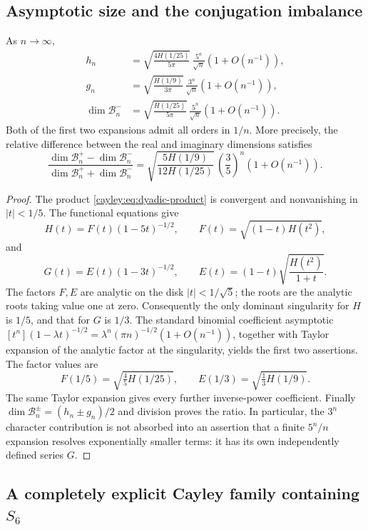 \subsection{Asymptotic size and the conjugation imbalance}

\begin{corollary}
\label{cayley:cor:asymptotic}
As $n\to\infty$,
\begin{align}
 h_n&=
 \sqrt{\frac{4H(1/25)}{5\pi}}\,
 \frac{5^n}{\sqrt n}\left(1+O(n^{-1})\right),\\
 g_n&=
 \sqrt{\frac{H(1/9)}{3\pi}}\,
 \frac{3^n}{\sqrt n}\left(1+O(n^{-1})\right),\\
 \dim\mathcal B_n^-&=
 \sqrt{\frac{H(1/25)}{5\pi}}\,
 \frac{5^n}{\sqrt n}\left(1+O(n^{-1})\right).
\end{align}
Both of the first two expansions admit all orders in $1/n$.
More precisely, the relative difference between the real and
imaginary dimensions satisfies
\[
 \frac{\dim\mathcal B_n^+-\dim\mathcal B_n^-}
      {\dim\mathcal B_n^++\dim\mathcal B_n^-}
 =
 \sqrt{\frac{5H(1/9)}{12H(1/25)}}\,
 \left(\frac35\right)^n\left(1+O(n^{-1})\right).
\]
\end{corollary}

\begin{proof}
The product \eqref{cayley:eq:dyadic-product} is convergent and
nonvanishing in $|t|<1/5$.  The functional equations give
\[
 H(t)=F(t)(1-5t)^{-1/2},\qquad
 F(t)=\sqrt{(1-t)H(t^2)},
\]
and
\[
 G(t)=E(t)(1-3t)^{-1/2},\qquad
 E(t)=(1-t)\sqrt{\frac{H(t^2)}{1+t}}.
\]
The factors $F,E$ are analytic on the disk $|t|<1/\sqrt5$;
the roots are the analytic roots taking value one at zero.
Consequently the only dominant singularity for $H$ is $1/5$,
and that for $G$ is $1/3$.  The standard binomial coefficient
asymptotic
$[t^n](1-\lambda t)^{-1/2}
=\lambda^n(\pi n)^{-1/2}(1+O(n^{-1}))$,
together with Taylor expansion of the analytic factor at the
singularity, yields the first two assertions.  The factor values are
\[
 F(1/5)=\sqrt{\tfrac45 H(1/25)},\qquad
 E(1/3)=\sqrt{\tfrac13 H(1/9)}.
\]
The same Taylor expansion gives every further inverse-power
coefficient.  Finally
$\dim\mathcal B_n^\pm=(h_n\pm g_n)/2$ and division proves the ratio.
In particular, the $3^n$ character contribution is not absorbed into
an assertion that a finite $5^n/n$ expansion resolves exponentially
smaller terms: it has its own independently defined series $G$.
\end{proof}

\subsection{A completely explicit Cayley family containing \texorpdfstring{$S_6$}{S6}}

